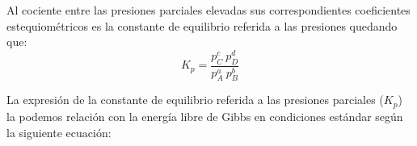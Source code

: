 %
%
    Al cociente entre las presiones parciales elevadas sus correspondientes coeficientes estequiométricos es la constante de equilibrio referida a las presiones quedando que:
    \begin{equation}
        K_p = \dfrac{p_C^c\ p_D^d}{p_A^a\ p_B^b} \label{eq:k_p}
    \end{equation}

    La expresión de la constante de equilibrio referida a las presiones parciales (\( K_p \)) la podemos relación con la energía libre de Gibbs en condiciones estándar según la siguiente ecuación:

